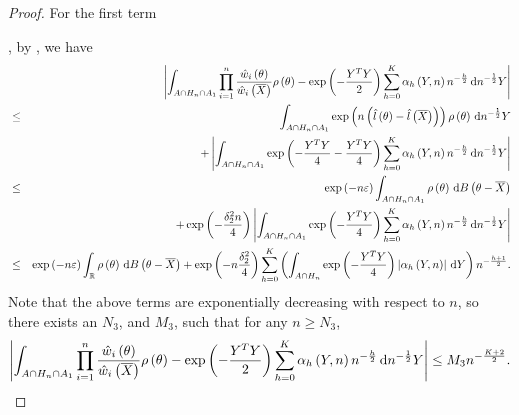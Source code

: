 \begin{proof}
For the first term%
\begin{comment}
change the first second term ref into ref eq
\end{comment}
, by , we have
\begin{eqnarray*}
 &  & \left|\int_{A\cap H_{n}\cap A_{1}}\prod_{i=1}^{n}\frac{\hat{w}_{i}\left(\theta\right)}{\hat{w}_{i}\left(\overline{X}\right)}\rho\left(\theta\right)-\exp\left(-\frac{Y^{T}Y}{2}\right)\sum_{h=0}^{K}\alpha_{h}\left(Y,n\right)n^{-\frac{h}{2}}\,\mathrm{d} n^{-\frac{1}{2}}Y\right|\\
 & \le & \int_{A\cap H_{n}\cap A_{1}}\exp\left(n\left(\hat{l}\left(\theta\right)-\hat{l}\left(\overline{X}\right)\right)\right)\rho\left(\theta\right)\,\mathrm{d} n^{-\frac{1}{2}}Y\\
 &  & +\left|\int_{A\cap H_{n}\cap A_{1}}\exp\left(-\frac{Y^{T}Y}{4}-\frac{Y^{T}Y}{4}\right)\sum_{h=0}^{K}\alpha_{h}\left(Y,n\right)n^{-\frac{h}{2}}\,\mathrm{d} n^{-\frac{1}{2}}Y\right|\\
 & \le & \exp\left(-n\varepsilon\right)\int_{A\cap H_{n}\cap A_{1}}\rho\left(\theta\right)\,\mathrm{d} B\left(\theta-\overline{X}\right)\\
 &  & +\exp\left(-\frac{\delta_{2}^{2}n}{4}\right)\left|\int_{A\cap H_{n}\cap A_{1}}\exp\left(-\frac{Y^{T}Y}{4}\right)\sum_{h=0}^{K}\alpha_{h}\left(Y,n\right)n^{-\frac{h}{2}}\,\mathrm{d} n^{-\frac{1}{2}}Y\right|\\
 & \le & \exp\left(-n\varepsilon\right)\int_{\mathbb{R}}\rho\left(\theta\right)\,\mathrm{d} B\left(\theta-\overline{X}\right)+\exp\left(-n\frac{\delta_{2}^{2}}{4}\right)\sum_{h=0}^{K}\left(\int_{A\cap H_{n}}\exp\left(-\frac{Y^{T}Y}{4}\right)\left|\alpha_{h}\left(Y,n\right)\right|\,\mathrm{d} Y\right)n^{-\frac{h+1}{2}}.
\end{eqnarray*}
Note that the above terms are exponentially decreasing with respect
to $n$, so there exists an $N_{3}$, and $M_{3}$, such that for
any $n\ge N_{3}$, 
\[
\left|\int_{A\cap H_{n}\cap A_{1}}\prod_{i=1}^{n}\frac{\hat{w}_{i}\left(\theta\right)}{\hat{w}_{i}\left(\overline{X}\right)}\rho\left(\theta\right)-\exp\left(-\frac{Y^{T}Y}{2}\right)\sum_{h=0}^{K}\alpha_{h}\left(Y,n\right)n^{-\frac{h}{2}}\,\mathrm{d} n^{-\frac{1}{2}}Y\right|\le M_{3}n^{-\frac{K+2}{2}}.
\]



\end{proof}
